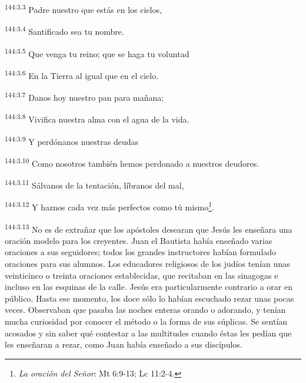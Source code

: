 \par 
\textsuperscript{144:3.3} Padre nuestro que estás en los cielos,

\par 
\textsuperscript{144:3.4} Santificado sea tu nombre.

\par 
\textsuperscript{144:3.5} Que venga tu reino; que se haga tu voluntad

\par 
\textsuperscript{144:3.6} En la Tierra al igual que en el cielo.

\par 
\textsuperscript{144:3.7} Danos hoy nuestro pan para mañana;

\par 
\textsuperscript{144:3.8} Vivifica nuestra alma con el agua de la vida.

\par 
\textsuperscript{144:3.9} Y perdónanos nuestras deudas

\par 
\textsuperscript{144:3.10} Como nosotros también hemos perdonado a nuestros deudores.

\par 
\textsuperscript{144:3.11} Sálvanos de la tentación, líbranos del mal,

\par 
\textsuperscript{144:3.12} Y haznos cada vez más perfectos como tú mismo\footnote{\textit{La oración del Señor}: Mt 6:9-13; Lc 11:2-4.}.
\bigbreak
\par 
\textsuperscript{144:3.13} No es de extrañar que los apóstoles desearan que Jesús les enseñara una oración modelo para los creyentes. Juan el Bautista había enseñado varias oraciones a sus seguidores; todos los grandes instructores habían formulado oraciones para sus alumnos. Los educadores religiosos de los judíos tenían unas veinticinco o treinta oraciones establecidas, que recitaban en las sinagogas e incluso en las esquinas de la calle. Jesús era particularmente contrario a orar en público. Hasta ese momento, los doce sólo lo habían escuchado rezar unas pocas veces. Observaban que pasaba las noches enteras orando o adorando, y tenían mucha curiosidad por conocer el método o la forma de sus súplicas. Se sentían acosados y sin saber qué contestar a las multitudes cuando éstas les pedían que les enseñaran a rezar, como Juan había enseñado a sus discípulos.

